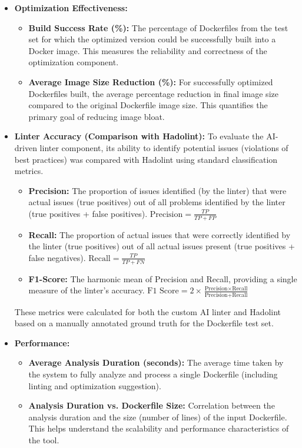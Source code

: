 \begin{itemize}
    \item \textbf{Optimization Effectiveness:}
        \begin{itemize}
            \item \textbf{Build Success Rate (\%):} The percentage of Dockerfiles from the test set for which the optimized version could be successfully built into a Docker image. This measures the reliability and correctness of the optimization component.
            \item \textbf{Average Image Size Reduction (\%):} For successfully optimized Dockerfiles built, the average percentage reduction in final image size compared to the original Dockerfile image size. This quantifies the primary goal of reducing image bloat.
        \end{itemize}
    \item \textbf{Linter Accuracy (Comparison with Hadolint):} To evaluate the AI-driven linter component, its ability to identify potential issues (violations of best practices) was compared with Hadolint using standard classification metrics.
        \begin{itemize}
            \item \textbf{Precision:} The proportion of issues identified (by the linter) that were actual issues (true positives) out of all problems identified by the linter (true positives + false positives). \( \text{Precision} = \frac{TP}{TP + FP} \)
            \item \textbf{Recall:} The proportion of actual issues that were correctly identified by the linter (true positives) out of all actual issues present (true positives + false negatives). \( \text{Recall} = \frac{TP}{TP + FN} \)
            \item \textbf{F1-Score:} The harmonic mean of Precision and Recall, providing a single measure of the linter's accuracy. \( \text{F1 Score} = 2 \times \frac{\text{Precision} \times \text{Recall}}{\text{Precision} + \text{Recall}} \)
        \end{itemize}
        These metrics were calculated for both the custom AI linter and Hadolint based on a manually annotated ground truth for the Dockerfile test set.
    \item \textbf{Performance:}
        \begin{itemize}
            \item \textbf{Average Analysis Duration (seconds):} The average time taken by the system to fully analyze and process a single Dockerfile (including linting and optimization suggestion).
            \item \textbf{Analysis Duration vs. Dockerfile Size:} Correlation between the analysis duration and the size (number of lines) of the input Dockerfile. This helps understand the scalability and performance characteristics of the tool.
        \end{itemize}
\end{itemize}

